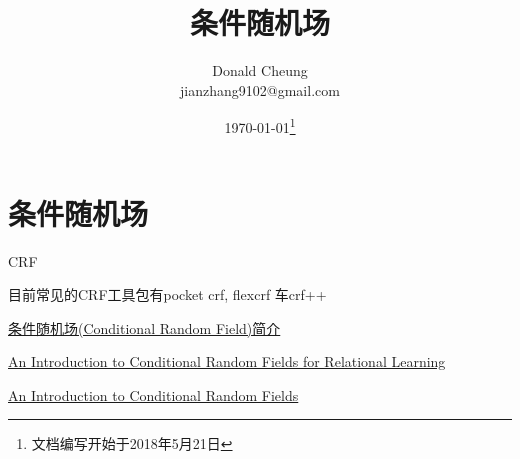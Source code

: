 \ifx\mlnotes\undefined
    \providecommand{\notesroot}{../..}
    \providecommand{\crfroot}{.}

    \title{条件随机场}
    \author{Donald Cheung\\jianzhang9102@gmail.com}
    \date{\today\footnote{文档编写开始于2018年5月21日}}

    
\else
    \providecommand{\crfroot}{\mlroot/crf}
\fi

\chapter{条件随机场}
CRF

目前常见的CRF工具包有pocket crf, flexcrf 车crf++

\href{http://blog.csdn.net/aws3217150/article/details/68935789}{条件随机场(Conditional Random Field)简介}

\href{http://people.cs.umass.edu/~mccallum/papers/crf-tutorial.pdf}{An Introduction to Conditional Random Fields for Relational Learning}

\href{https://homepages.inf.ed.ac.uk/csutton/publications/crftutv2.pdf}{An Introduction to Conditional Random Fields}

\ifx\mlnotes\undefined
    
\fi
